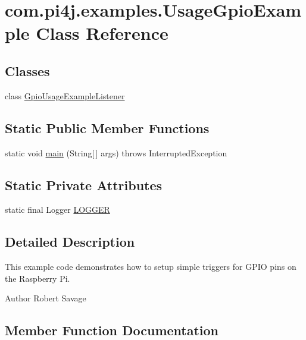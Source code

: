 \hypertarget{classcom_1_1pi4j_1_1examples_1_1UsageGpioExample}{}\section{com.\+pi4j.\+examples.\+Usage\+Gpio\+Example Class Reference}
\label{classcom_1_1pi4j_1_1examples_1_1UsageGpioExample}
\subsection*{Classes}
\begin{DoxyCompactItemize}
\item 
class \hyperlink{classcom_1_1pi4j_1_1examples_1_1UsageGpioExample_1_1GpioUsageExampleListener}{Gpio\+Usage\+Example\+Listener}
\end{DoxyCompactItemize}
\subsection*{Static Public Member Functions}
\begin{DoxyCompactItemize}
\item 
static void \hyperlink{classcom_1_1pi4j_1_1examples_1_1UsageGpioExample_a3e0037b97996d49eafd6b96102d6e248}{main} (String\mbox{[}$\,$\mbox{]} args)  throws Interrupted\+Exception 
\end{DoxyCompactItemize}
\subsection*{Static Private Attributes}
\begin{DoxyCompactItemize}
\item 
static final Logger \hyperlink{classcom_1_1pi4j_1_1examples_1_1UsageGpioExample_a1cff0316c22ecf42864e50c3487256b9}{L\+O\+G\+G\+E\+R}
\end{DoxyCompactItemize}


\subsection{Detailed Description}
This example code demonstrates how to setup simple triggers for G\+P\+I\+O pins on the Raspberry Pi.

\begin{DoxyAuthor}{Author}
Robert Savage 
\end{DoxyAuthor}


\subsection{Member Function Documentation}
\hypertarget{classcom_1_1pi4j_1_1examples_1_1UsageGpioExample_a3e0037b97996d49eafd6b96102d6e248}{}
